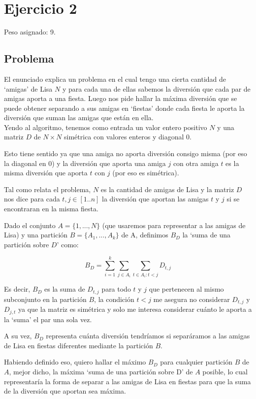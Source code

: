 \section{Ejercicio 2}

Peso asignado: 9.
\subsection{Problema}
El enunciado explica un problema en el cual tengo una cierta cantidad de
`amigas' de Lisa $N$ y para cada una de ellas sabemos la diversión que cada par
de amigas aporta a una fiesta. Luego nos pide hallar la máxima diversión que se
puede obtener separando a sus amigas en `fiestas' donde cada fiesta le aporta la
diversión que suman las amigas que están en ella. \\ Yendo al algoritmo, tenemos
como entrada un valor entero positivo $N$ y una
matriz $D$ de $N \times N$ simétrica con valores enteros y diagonal 0.

Esto tiene sentido ya que una amiga no aporta diversión consigo misma (por eso
la diagonal en 0) y la diversión que aporta una amiga $j$ con otra amiga $t$ es
la misma diversión que aporta $t$ con $j$ (por eso es simétrica).

Tal como relata el problema, $N$ es la cantidad de amigas de Lisa y la matriz
$D$ nos dice para cada $t,j \in [1..n]$ la diversión que aportan las amigas $t$
y $j$ si se encontraran en la misma fiesta.

Dado el conjunto $A = \{1,...,N\}$ (que usaremos para representar a las amigas
de Lisa) y una partición $B = \{A_1,...,A_k\}$ de A, definimos $B_D$ la `suma de
una partición sobre $D$' como:

\begin{equation*}
    B_D = \sum_{i=1}^{k}{\sum_{j \in A_i}^{}{\sum_{t \in A_i : t < j}^{}{D_{t,j}}}}
\end{equation*}

Es decir, $B_D$ es la suma de $D_{t,j}$ para todo $t$ y $j$ que pertenecen al
mismo subconjunto en la partición $B$, la condición $t < j$ me asegura no
considerar $D_{t,j}$ y $D_{j,t}$ ya que la matriz es simétrica y solo me
interesa considerar cuánto le aporta a la `suma' el par una sola vez.

A su vez, $B_D$ representa cuánta diversión tendríamos si separáramos a las
amigas de Lisa en fiestas diferentes mediante la partición $B$.

Habiendo definido eso, quiero hallar el máximo $B_D$ para cualquier partición
$B$ de $A$, mejor dicho, la máxima `suma de una partición sobre D' de $A$
posible, lo cual representaría la forma de separar a las amigas de Lisa en
fiestas para que la suma de la diversión que aportan sea máxima.

